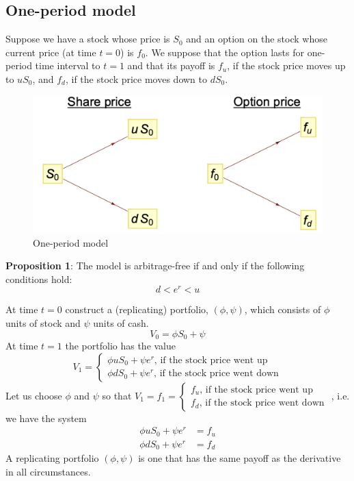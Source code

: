\documentclass[11pt,a4paper]{book}
\theoremstyle{definition}\newtheorem{definition}{Definition}
\theoremstyle{definition}\newtheorem{fact}{Fact}
\theoremstyle{definition}\newtheorem{remark}{Remark}
\theoremstyle{definition}\newtheorem{ex}{Ex.}
\theoremstyle{definition}\newtheorem{project}{Project}
\theoremstyle{definition}\newtheorem{problem}{Problem}
\theoremstyle{definition}\newtheorem{example}{Example}
\numberwithin{theorem}{section}
\numberwithin{corollary}{chapter}
\numberwithin{assumption}{chapter}
\numberwithin{definition}{chapter}
\numberwithin{prop}{chapter}
\numberwithin{notation}{chapter}
\numberwithin{problem}{chapter}
\numberwithin{example}{chapter}
\numberwithin{fact}{chapter}
\numberwithin{ex}{chapter}
\begin{document}
\subsection{One-period model}
Suppose we have a stock whose price is $S_0$ and an option on the stock whose current price (at time $t=0$) is $f_0$. We suppose that the option lasts for one-period time interval to $t=1$ and that its payoff is $f_u$, if the stock price moves up to $u S_0$, and $f_d$, if the stock price moves down to $d S_0$.

\begin{figure}[H]
	\centering
	\includegraphics[scale=0.5]{Chapter 4/Chapter4_1.png}
	\caption{One-period model}
\end{figure}

\textbf{Proposition 1}: The model is arbitrage-free if and only if the following conditions hold:
\begin{equation}
d < e^r < u
\end{equation}

At time $t=0$ construct a (replicating) portfolio, $(\phi,\psi)$, which consists of $\phi$ units of stock and $\psi$ units of cash.
$$ V_0 = \phi S_0 + \psi $$
At time $t=1$ the portfolio has the value
$$ V_1 = \begin{cases}
\phi u S_0 + \psi e^r \text{,     if the stock price went up} \\
\phi d S_0 + \psi e^r \text{,     if the stock price went down}
\end{cases} $$
Let us choose $\phi$ and $\psi$ so that $V_1 = f_1 = \begin{cases}
f_u \text{,     if the stock price went up} \\
f_d \text{,     if the stock price went down}
\end{cases}$
, i.e. we have the system
\begin{align}
\phi u S_0 + \psi e^r &= f_u \nonumber \\
\phi d S_0 + \psi e^r &= f_d
\end{align}
A replicating portfolio $(\phi, \psi)$ is one that has the same payoff as the derivative in all circumstances.
\end{document}
